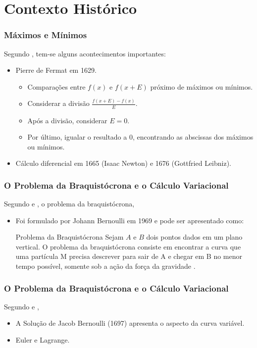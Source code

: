 \documentclass{beamer}
\begin{document}
	\section{Contexto Histórico}

	\begin{frame}
		\frametitle{Máximos e Mínimos}
		\justify
	
		Segundo , tem-se alguns acontecimentos importantes:
		\begin{itemize}
			\item Pierre de Fermat em 1629.
			\pause
			\begin{itemize}
				\item Comparações entre $f(x)$ e $f(x+E)$ próximo de máximos ou mínimos.
				\pause
				\item Considerar a divisão $\frac{f(x+E)-f(x)}{E}$.
				\pause
				\item Após a divisão, considerar $E=0$.
				\pause
				\item Por último, igualar o resultado a $0$, encontrando as abscissas dos máximos ou mínimos.
			\end{itemize}
			\pause
			\item Cálculo diferencial em 1665 (Isaac Newton) e 1676 (Gottfried Leibniz).
		\end{itemize}
	\end{frame}

	\begin{frame}
		\frametitle{O Problema da Braquistócrona e o Cálculo Variacional}
		\justify
	
		Segundo  e , o problema da braquistócrona,
		\begin{itemize}
			\item Foi formulado por Johann Bernoulli em 1969 e pode ser apresentado como:
			\begin{block}{Problema da Braquistócrona}
				Sejam $A$ e $B$ dois pontos dados em um plano vertical. O problema da braquistócrona consiste em encontrar a curva que uma partícula M precisa descrever para sair de A e chegar em B no menor tempo possível, somente sob a ação da força da gravidade \cite[p. 3]{calcvar}.
			\end{block}
		\end{itemize}
	\end{frame}

	\begin{frame}
		\frametitle{O Problema da Braquistócrona e o Cálculo Variacional}
		\justify

		Segundo  e \citeonline{hist_still},
		\begin{itemize}
			\item A Solução de Jacob Bernoulli (1697) apresenta o aspecto da curva variável.
			\pause
		
			\item Euler e Lagrange.
		\end{itemize}
	\end{frame}
	
\end{document}
